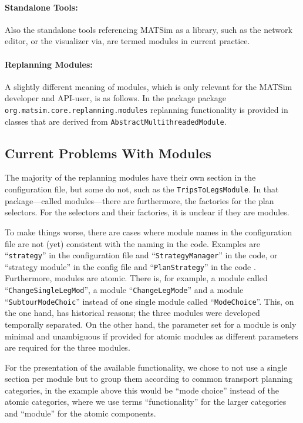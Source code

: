 \paragraph{Standalone Tools:} %
Also the standalone tools referencing MATSim as a library, such as the network editor, or the visualizer via, are termed modules in current practice.

\paragraph{Replanning Modules:} %
A slightly different meaning of modules, which is only relevant for the MATSim developer and API-user, is as follows. In the package package \lstinline|org.matsim.core.replanning.modules| replanning functionality is provided in classes that are derived from \lstinline|AbstractMultithreadedModule|.

\subsection{Current Problems With Modules}
The majority of the replanning modules have their own section in the configuration file, but some do not, such as the \lstinline|TripsToLegsModule|. In that package---called modules---there are furthermore, the factories for the plan selectors. For the selectors and their factories, it is unclear if they are modules.

To make things worse, there are cases where module names in the configuration file are not (yet) consistent with the naming in the code. Examples are ``\lstinline|strategy|'' in the configuration file and ``\lstinline|StrategyManager|'' in the code, or ``strategy module'' in the config file and ``\lstinline|PlanStrategy|'' in the code . Furthermore, modules are atomic. There is, for example, a module called ``\lstinline|ChangeSingleLegMod|'', a module ``\lstinline|ChangeLegMode|'' and a module ``\lstinline|SubtourModeChoic|'' instead of one single module called ``\lstinline|ModeChoice|''. This, on the one hand, has historical reasons; the three modules were developed temporally separated. On the other hand, the parameter set for a module is only minimal and unambiguous if provided for atomic modules as different parameters are required for the three modules.

For the presentation of the available functionality, we chose to not use a single section per module but to group them according to common transport planning categories, in the example above this would be ``mode choice'' instead of the atomic categories, where we use terms ``functionality'' for the larger categories and ``module'' for the atomic components.

